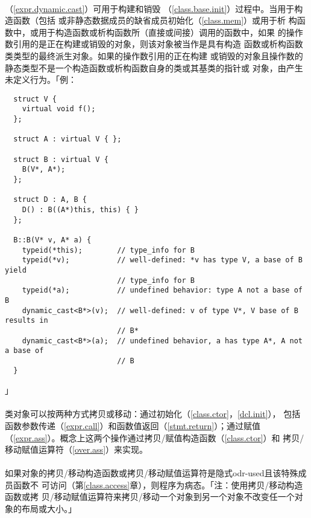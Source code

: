 \paragraph{}
（\ref{expr.dynamic.cast}）可用于构建和销毁
（\ref{class.base.init}）过程中。当用于构造函数（包括
或非静态数据成员的缺省成员初始化（\ref{class.mem}）或用于析
构函数中，或用于构造函数或析构函数所（直接或间接）调用的函数中，如果
的操作数引用的是正在构建或销毁的对象，则该对象被当作是具有构造
函数或析构函数类类型的最终派生对象。如果的操作数引用的正在构建
或销毁的对象且操作数的静态类型不是一个构造函数或析构函数自身的类或其基类的指针或
对象，由产生未定义行为。「例：
\begin{lstlisting}
  struct V {
    virtual void f();
  };

  struct A : virtual V { };

  struct B : virtual V {
    B(V*, A*);
  };

  struct D : A, B {
    D() : B((A*)this, this) { }
  };

  B::B(V* v, A* a) {
    typeid(*this);        // type_info for B
    typeid(*v);           // well-defined: *v has type V, a base of B yield
                          // type_info for B
    typeid(*a);           // undefined behavior: type A not a base of B
    dynamic_cast<B*>(v);  // well-defined: v of type V*, V base of B results in
                          // B*
    dynamic_cast<B*>(a);  // undefined behavior, a has type A*, A not a base of
                          // B
  }
\end{lstlisting}」

\paragraph{}
类对象可以按两种方式拷贝或移动：通过初始化（\ref{class.ctor}，\ref{dcl.init}），
包括函数参数传递（\ref{expr.call}）和函数值返回（\ref{stmt.return}）；通过赋值
（\ref{expr.ass}）。概念上这两个操作通过拷贝/赋值构造函数（\ref{class.ctor}）和
拷贝/移动赋值运算符（\ref{over.ass}）来实现。

\paragraph{}
如果对象的拷贝/移动构造函数或拷贝/移动赋值运算符是隐式odr-used且该特殊成员函数不
可访问（第\ref{class.access}章），则程序为病态。「注：使用拷贝/移动构造函数或拷
贝/移动赋值运算符来拷贝/移动一个对象到另一个对象不改变任一个对象的布局或大小。」

